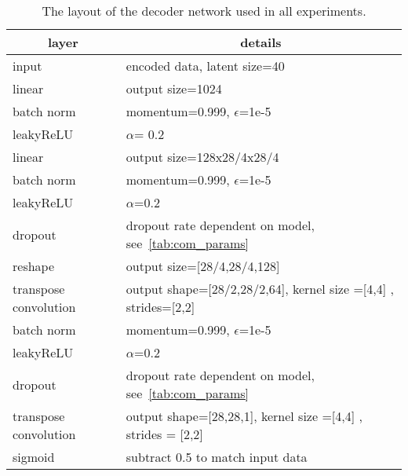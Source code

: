 \documentclass[10pt]{article} \usepackage[accepted]{tmlr}
\begin{document}
\begin{table}[h]
{\begin{tabular}{ll}
\multicolumn{1}{c|}{\textbf{layer}}        & \multicolumn{1}{c}{\textbf{details}}                                             \\ \hline
\multicolumn{1}{l|}{input}                 & encoded data, latent size=40 \\
\multicolumn{1}{l|}{linear}                & output size=1024                                                               \\
\multicolumn{1}{l|}{batch norm}             & momentum=0.999, $\epsilon$=1e-5                                                   \\
\multicolumn{1}{l|}{leakyReLU}             & $\alpha$= 0.2                                                                       \\
\multicolumn{1}{l|}{linear}                & output size=128x28/4x28/4                                                    \\
\multicolumn{1}{l|}{batch norm}             & momentum=0.999, $\epsilon$=1e-5                                                   \\
\multicolumn{1}{l|}{leakyReLU}             & $\alpha$=0.2                                                                       \\
\multicolumn{1}{l|}{dropout}               & dropout rate dependent on model, see~\ref{tab:com_params}                                                               \\
\multicolumn{1}{l|}{reshape}               & output size={[}28/4,28/4,128{]}                                              \\
\multicolumn{1}{l|}{transpose convolution} & output shape={[}28/2,28/2,64{]}, kernel size ={[}4,4{]} , strides={[}2,2{]} \\
\multicolumn{1}{l|}{batch norm}             & momentum=0.999, $\epsilon$=1e-5                                                   \\
\multicolumn{1}{l|}{leakyReLU}             & $\alpha$=0.2                                                                       \\
\multicolumn{1}{l|}{dropout}               & dropout rate dependent on model, see~\ref{tab:com_params}                                                   \\
\multicolumn{1}{l|}{transpose convolution} & output shape={[}28,28,1{]}, kernel size ={[}4,4{]} , strides = {[}2,2{]}        \\
\multicolumn{1}{l|}{sigmoid}               & subtract 0.5 to match input data                                                
\end{tabular}}
\caption{\label{tab:dec_archi} The layout of the decoder network used in all experiments.}
\end{table}
\end{document}
